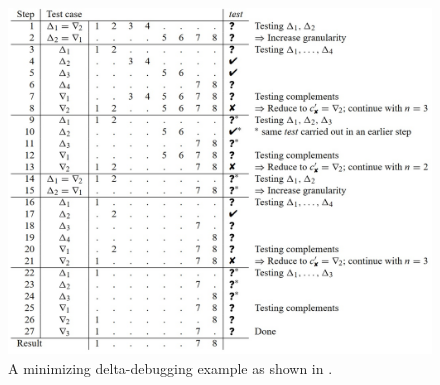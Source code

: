 \begin{figure}
	\centering
	\includegraphics[width=1.0\textwidth]{images/ddminExampleFromPaper5}
	\caption{A minimizing delta-debugging example as shown in \cite{5zeller2002simplifyingIsolatingFailure-inducing}.}
	\label{fig:ddminExample}
\end{figure}

